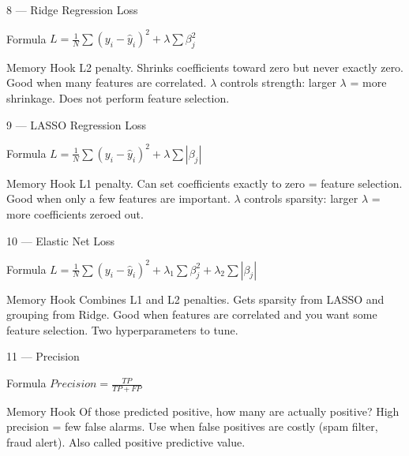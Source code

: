 \documentclass[aspectratio=169,8pt]{beamer}
\begin{document}
	\begin{frame}{8 --- Ridge Regression Loss}
		\begin{block}{Formula}
			$L = \frac{1}{N}\sum(y_i - \hat{y}_i)^2 + \lambda\sum\beta_j^2$
		\end{block}
		\begin{block}{Memory Hook}
			L2 penalty. Shrinks coefficients toward zero but never exactly zero. Good when many features are correlated. $\lambda$ controls strength: larger $\lambda$ = more shrinkage. Does not perform feature selection.
		\end{block}
	\end{frame}
	
	\begin{frame}{9 --- LASSO Regression Loss}
		\begin{block}{Formula}
			$L = \frac{1}{N}\sum(y_i - \hat{y}_i)^2 + \lambda\sum|\beta_j|$
		\end{block}
		\begin{block}{Memory Hook}
			L1 penalty. Can set coefficients exactly to zero = feature selection. Good when only a few features are important. $\lambda$ controls sparsity: larger $\lambda$ = more coefficients zeroed out.
		\end{block}
	\end{frame}
	
	\begin{frame}{10 --- Elastic Net Loss}
		\begin{block}{Formula}
			$L = \frac{1}{N}\sum(y_i - \hat{y}_i)^2 + \lambda_1\sum\beta_j^2 + \lambda_2\sum|\beta_j|$
		\end{block}
		\begin{block}{Memory Hook}
			Combines L1 and L2 penalties. Gets sparsity from LASSO and grouping from Ridge. Good when features are correlated and you want some feature selection. Two hyperparameters to tune.
		\end{block}
	\end{frame}
	
	\begin{frame}{11 --- Precision}
		\begin{block}{Formula}
			$Precision = \frac{TP}{TP + FP}$
		\end{block}
		\begin{block}{Memory Hook}
			Of those predicted positive, how many are actually positive? High precision = few false alarms. Use when false positives are costly (spam filter, fraud alert). Also called positive predictive value.
		\end{block}
	\end{frame}
	
\end{document}
